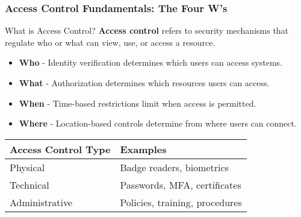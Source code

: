 \documentclass{beamer}
\begin{document}
    \begin{frame}
    \frametitle{Access Control Fundamentals: The Four W's}
    
    \begin{block}{What is Access Control?}
    \textbf{Access control} refers to security mechanisms that regulate who or what can view, use, or access a resource.
    \end{block}
    
    \begin{itemize}
    \item \textbf{Who} - Identity verification determines which users can access systems.
    \item \textbf{What} - Authorization determines which resources users can access.
    \item \textbf{When} - Time-based restrictions limit when access is permitted.
    \item \textbf{Where} - Location-based controls determine from where users can connect.
    \end{itemize}
    
    \begin{tabular}{|l|l|}
    \hline
    \textbf{Access Control Type} & \textbf{Examples} \\
    \hline
    Physical & Badge readers, biometrics \\
    Technical & Passwords, MFA, certificates \\
    Administrative & Policies, training, procedures \\
    \hline
    \end{tabular}
    \end{frame}
    
\end{document}
